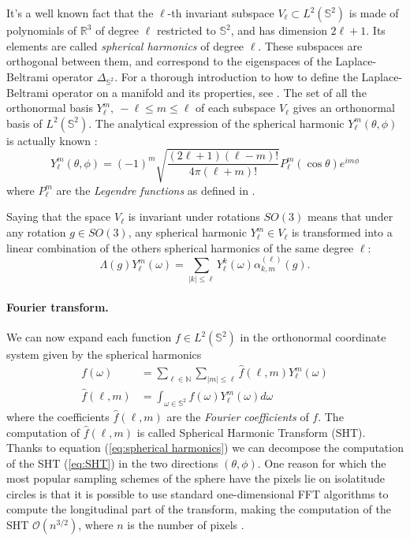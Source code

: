 It's a well known fact \cite{Driscoll:1994:CFT:184069.184073} that the $\ell$-th invariant subspace $V_\ell\subset L^2(\mathbb S^2)$ is made of polynomials of $\mathbb R^3$ of degree $\ell$ restricted to $\mathbb S^2$, and has dimension $2\ell+1$. Its elements are called \textit{spherical harmonics} of degree $\ell$. These subspaces are orthogonal between them, and correspond to the eigenspaces of the Laplace-Beltrami operator $\Delta_{\mathbb S^2}$. For a thorough introduction to how to define the Laplace-Beltrami operator on a manifold and its properties, see \cite{rosenberg_1997}. The set of all the orthonormal basis $Y_\ell^m,\ -\ell\leq m\leq\ell$ of each subspace $V_\ell$ gives an orthonormal basis of $L^2(\mathbb S^2)$. The analytical expression of the spherical harmonic $Y_\ell^m(\theta, \phi)$ is actually known \cite{Driscoll:1994:CFT:184069.184073}:
\begin{equation}\label{eq:spherical harmonics}
	Y_\ell^m(\theta, \phi) = (-1)^{m} \sqrt{\frac{(2 \ell+1)(\ell-m) !}{4 \pi(\ell+m) !}} P_{\ell}^{m}(\cos \theta) e^{i m \phi}
\end{equation}
where $P_{\ell}^{m}$ are the \textit{Legendre functions} as defined in \cite{Driscoll:1994:CFT:184069.184073}. 
\vspace{0.5cm}
\begin{remark}
	Saying that the space $V_\ell$ is invariant under rotations $SO(3)$ means that under any rotation $g\in SO(3)$, any spherical harmonic $Y_\ell^m\in V_\ell$ is transformed into a linear combination of the others spherical harmonics of the same degree $\ell$:
	$$
	\Lambda(g) Y_{\ell}^{m}(\omega)=\sum_{|k| \leq \ell} Y_{\ell}^{k}(\omega) \alpha_{k, m}^{(\ell)}(g).
	$$
\end{remark}
\vspace{0.5cm}

\paragraph{Fourier transform.}
We can now expand each function $f\in L^2(\mathbb S^2)$ in the orthonormal coordinate system given by the spherical harmonics 
\begin{align}\label{eq:inverse spherical fourier transform}
	f(\omega) &= \sum_{\ell\in\mathbb N}\sum_{|m|\leq \ell}\hat f(\ell,m) Y_\ell^m(\omega)\\
	\hat f(\ell,m) &=\int_{\omega\in\mathbb S^2}f(\omega)Y_\ell^m(\omega)d\omega \label{eq:SHT}
\end{align}
where the coefficients $\hat f(\ell,m)$ are the \textit{Fourier coefficients} of $f$. The computation of $\hat f(\ell, m)$ is called Spherical Harmonic Transform (SHT). Thanks to equation (\ref{eq:spherical harmonics}) we can decompose the computation of the SHT (\ref{eq:SHT}) in the two directions $(\theta, \phi)$. One reason for which the most popular sampling schemes of the sphere have the pixels lie on isolatitude circles is that it is possible to use standard one-dimensional FFT algorithms to compute the longitudinal part of the transform, making the computation of the SHT $\mathcal O(n^{3/2})$, where $n$ is the number of pixels \cite{HEALPix}.

